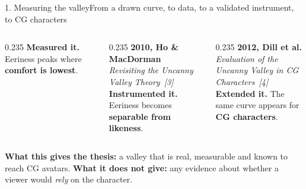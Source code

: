 \documentclass[aspectratio=169,10pt]{beamer}
\newcommand{\hl}[1]{{\color{knblue}\textbf{#1}}}
\begin{document}
\begin{frame}{1. Measuring the valley}{From a drawn curve, to data, to a validated instrument, to CG characters}
\begin{columns}[T]
\begin{column}{0.235\textwidth}
      {\scriptsize \hl{Measured it.} Eeriness peaks where \hl{comfort is lowest}.}
    \end{column}
    \begin{column}{0.235\textwidth}\centering
      {\scriptsize\bfseries 2010, Ho \& MacDorman}\\[0.25em]
      {\tiny\color{knblue}\itshape Revisiting the Uncanny Valley Theory~[3]}\\[0.4em]
      {\scriptsize \hl{Instrumented it.} Eeriness becomes \hl{separable from likeness}.}
    \end{column}
    \begin{column}{0.235\textwidth}\centering
      {\scriptsize\bfseries 2012, Dill et al.}\\[0.25em]
      {\tiny\color{knblue}\itshape Evaluation of the Uncanny Valley in CG Characters~[4]}\\[0.4em]
      {\scriptsize \hl{Extended it.} The same curve appears for \hl{CG characters}.}
    \end{column}
  \end{columns}
  \vfill
  \noindent\colorbox{knlight}{\parbox{0.975\textwidth}{\scriptsize\color{knblue}
  \textbf{What this gives the thesis:} a valley that is real, measurable and known to reach CG avatars. \textbf{What it does not give:} any evidence about whether a viewer would \emph{rely} on the character.}}
\end{frame}
\end{document}
